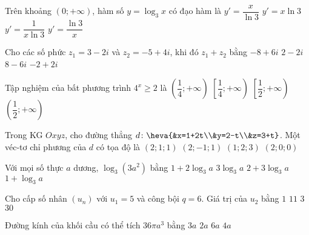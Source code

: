 \begin{ex}%
	Trên khoảng $(0;+\infty)$, hàm số $y=\log_3x$ có đạo hàm là
	\choice
	{$y'=\dfrac{x}{\ln 3}$}
	{$y'=x\ln 3$}
	{\True$y'=\dfrac{1}{x\ln 3}$}
	{$y'=\dfrac{\ln 3}{x}$}
\end{ex}

\begin{ex}%
	Cho các số phức $z_1=3-2i$ và $z_2=-5+4i$, khi đó $z_1+z_2$ bằng
	\choice
	{$-8+6i$}
	{$2-2i$}
	{$8-6i$}
	{\True$-2+2i$}
\end{ex}

\begin{ex}%
	Tập nghiệm của bất phương trình $4^x \ge 2$ là
	\choice
	{$\left(\dfrac{1}{4};+\infty\right)$}
	{$\left[\dfrac{1}{4};+\infty\right)$}
	{\True$\left[\dfrac{1}{2};+\infty\right)$}
	{$\left(\dfrac{1}{2};+\infty\right)$}
	\loigiai{
		$4^x \ge 2 \Leftrightarrow 2^{2x} \ge 2 \Leftrightarrow 2x \ge 1 \Leftrightarrow x \ge \dfrac{1}{2}$.\\
		Vậy tập nghiệm của bất phương trình là $S=\left[\dfrac{1}{2};+\infty\right)$.
	}
\end{ex}

\begin{ex}%
	Trong KG $Oxyz$, cho đường thẳng $d \colon \heva{&x=1+2t\\&y=2-t\\&z=3+t}$. Một véc-tơ chỉ phương của $d$ có tọa độ là
	\choice
	{$(2;1;1)$}
	{\True$(2;-1;1)$}
	{$(1;2;3)$}
	{$(2;0;0)$}
\end{ex}

\begin{ex}%
	Với mọi số thực $a$ dương, $\log_3(3a^2)$ bằng
	\choice
	{\True$1+2\log_3a$}
	{$3\log_3a$}
	{$2+3\log_3a$}
	{$1+\log_3a$}
\end{ex}

\begin{ex}%
	Cho cấp số nhân $(u_n)$ với $u_1=5$ và công bội $q=6$. Giá trị của $u_2$ bằng
	\choice
	{$1$}
	{$11$}
	{$3$}
	{\True$30$}
\end{ex}

\begin{ex}%
	Đường kính của khối cầu có thể tích $36\pi a^3$ bằng
	\choice
	{$3a$}
	{$2a$}
	{\True $6a$}
	{$4a$}
\end{ex}

